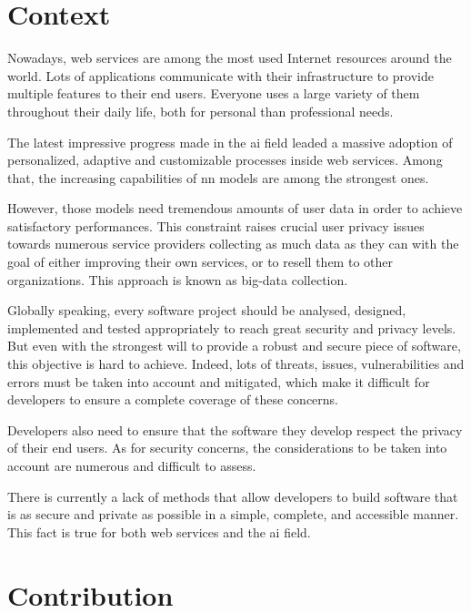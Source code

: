 \section{Context}
\label{sec:introduction_context}

Nowadays, web services are among the most used Internet resources around the world. Lots of applications communicate with their infrastructure to provide multiple features to their end users. Everyone uses a large variety of them throughout their daily life, both for personal than professional needs.

The latest impressive progress made in the \gls{ai} field leaded a massive adoption of personalized, adaptive and customizable processes inside web services. Among that, the increasing capabilities of \gls{nn} models are among the strongest ones.

However, those models need tremendous amounts of user data in order to achieve satisfactory performances. This constraint raises crucial user privacy issues towards numerous service providers collecting as much data as they can with the goal of either improving their own services, or to resell them to other organizations. This approach is known as \gls{big-data} collection. 

Globally speaking, every software project should be analysed, designed, implemented and tested appropriately to reach great security and privacy levels. But even with the strongest will to provide a robust and secure piece of software, this objective is hard to achieve. Indeed, lots of threats, issues, vulnerabilities and errors must be taken into account and mitigated, which make it difficult for developers to ensure a complete coverage of these concerns.

Developers also need to ensure that the software they develop respect the privacy of their end users. As for security concerns, the considerations to be taken into account are numerous and difficult to assess.

There is currently a lack of methods that allow developers to build software that is as secure and private as possible in a simple, complete, and accessible manner. This fact is true for both web services and the \gls{ai} field.

\section{Contribution}
\label{sec:introduction_contribution}

